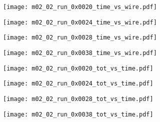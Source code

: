 \documentclass[11pt, ngerman, fleqn, DIV=15, headinclude, BCOR=2cm]{scrreprt}
\begin{document}
\begin{appendix}
	\begin{figure}
		\centering
	\begin{subfigure}[a]{0.45 \textwidth}
		\texttt{[image: m02\_02\_run\_0x0020\_time\_vs\_wire.pdf]}
		\caption{%
		}
		\label{fig:m02_02_run_0x0020_time_vs_wire}
	\end{subfigure}
	\begin{subfigure}[a]{0.45 \textwidth}
		\texttt{[image: m02\_02\_run\_0x0024\_time\_vs\_wire.pdf]}
		\caption{%
		}
		\label{fig:m02_02_run_0x0024_time_vs_wire}
	\end{subfigure}
	\begin{subfigure}[a]{0.45 \textwidth}
		\texttt{[image: m02\_02\_run\_0x0028\_time\_vs\_wire.pdf]}
		\caption{%
		}
		\label{fig:m02_02_run_0x0028_time_vs_wire}
	\end{subfigure}
	\begin{subfigure}[a]{0.45 \textwidth}
		\texttt{[image: m02\_02\_run\_0x0038\_time\_vs\_wire.pdf]}
		\caption{%
		}
		\label{fig:m02_02_run_0x0038_time_vs_wire}
	\end{subfigure}
	\caption{%
	}
	\label{fig:m02_02_time_vs_wire}
	\end{figure}

	\begin{figure}
		\centering
	\begin{subfigure}[a]{0.45 \textwidth}
		\texttt{[image: m02\_02\_run\_0x0020\_tot\_vs\_time.pdf]}
		\caption{%
		}
		\label{fig:m02_02_run_0x0020_tot_vs_time}
	\end{subfigure}
	\begin{subfigure}[a]{0.45 \textwidth}
		\texttt{[image: m02\_02\_run\_0x0024\_tot\_vs\_time.pdf]}
		\caption{%
		}
		\label{fig:m02_02_run_0x0024_tot_vs_time}
	\end{subfigure}
	\begin{subfigure}[a]{0.45 \textwidth}
		\texttt{[image: m02\_02\_run\_0x0028\_tot\_vs\_time.pdf]}
		\caption{%
		}
		\label{fig:m02_02_run_0x0028_tot_vs_time}
	\end{subfigure}
	\begin{subfigure}[a]{0.45 \textwidth}
		\texttt{[image: m02\_02\_run\_0x0038\_tot\_vs\_time.pdf]}
		\caption{%
		}
		\label{fig:m02_02_run_0x0038_tot_vs_time}
	\end{subfigure}
	\caption{%
	}
	\label{fig:m02_02_tot_vs_time}
	\end{figure}
	\clearpage



\end{appendix}
\end{document}
